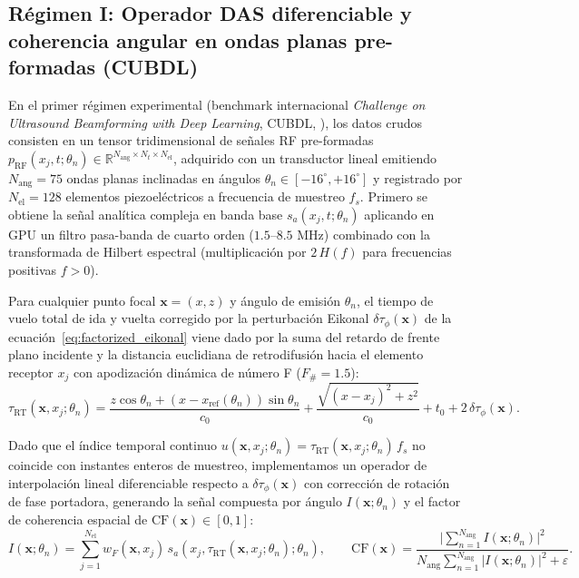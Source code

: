 \documentclass[9pt]{article}
\begin{document}
\subsection{Régimen I: Operador DAS diferenciable y coherencia angular en ondas planas pre-formadas (CUBDL)}
\label{subsec:regimen_cubdl}

En el primer régimen experimental (benchmark internacional \textit{Challenge on Ultrasound Beamforming with Deep Learning}, CUBDL, \cite{Hyun2020}), los datos crudos consisten en un tensor tridimensional de señales RF pre-formadas $p_{\text{RF}}(x_j, t; \theta_n) \in \mathbb{R}^{N_{\text{ang}} \times N_t \times N_{\text{el}}}$, adquirido con un transductor lineal emitiendo $N_{\text{ang}} = 75$ ondas planas inclinadas en ángulos $\theta_n \in [-16^\circ, +16^\circ]$ y registrado por $N_{\text{el}} = 128$ elementos piezoeléctricos a frecuencia de muestreo $f_s$. Primero se obtiene la señal analítica compleja en banda base $s_a(x_j, t; \theta_n)$ aplicando en GPU un filtro pasa-banda de cuarto orden ($1.5\text{--}8.5\text{ MHz}$) combinado con la transformada de Hilbert espectral (multiplicación por $2\,H(f)$ para frecuencias positivas $f > 0$).

Para cualquier punto focal $\mathbf{x} = (x, z)$ y ángulo de emisión $\theta_n$, el tiempo de vuelo total de ida y vuelta corregido por la perturbación Eikonal $\delta\tau_\phi(\mathbf{x})$ de la ecuación~\eqref{eq:factorized_eikonal} viene dado por la suma del retardo de frente plano incidente y la distancia euclidiana de retrodifusión hacia el elemento receptor $x_j$ con apodización dinámica de número F ($F_{\#} = 1.5$):
\begin{equation}
\tau_{\text{RT}}(\mathbf{x}, x_j; \theta_n) = \frac{z\cos\theta_n + (x - x_{\text{ref}}(\theta_n))\sin\theta_n}{c_0} + \frac{\sqrt{(x - x_j)^2 + z^2}}{c_0} + t_0 + 2\,\delta\tau_\phi(\mathbf{x}).
\label{eq:das_delay}
\end{equation}

Dado que el índice temporal continuo $u(\mathbf{x}, x_j; \theta_n) = \tau_{\text{RT}}(\mathbf{x}, x_j; \theta_n)\,f_s$ no coincide con instantes enteros de muestreo, implementamos un operador de interpolación lineal diferenciable respecto a $\delta\tau_\phi(\mathbf{x})$ con corrección de rotación de fase portadora, generando la señal compuesta por ángulo $I(\mathbf{x}; \theta_n)$ y el factor de coherencia espacial de \textcite{Mallart1994} $\text{CF}(\mathbf{x}) \in [0, 1]$:
\begin{equation}
I(\mathbf{x}; \theta_n) = \sum_{j=1}^{N_{\text{el}}} w_F(\mathbf{x}, x_j)\,s_a\!\left(x_j, \tau_{\text{RT}}(\mathbf{x}, x_j; \theta_n); \theta_n\right), \qquad \text{CF}(\mathbf{x}) = \frac{\Big\lvert\sum_{n=1}^{N_{\text{ang}}} I(\mathbf{x}; \theta_n)\Big\rvert^2}{N_{\text{ang}}\sum_{n=1}^{N_{\text{ang}}} \lvert I(\mathbf{x}; \theta_n)\rvert^2 + \varepsilon}.
\label{eq:mallart_fink_cf}
\end{equation}
\end{document}
